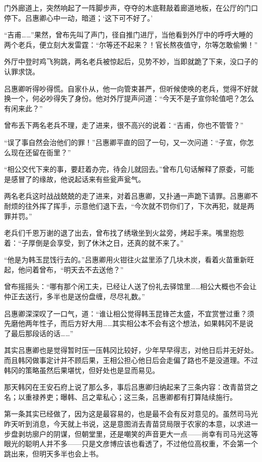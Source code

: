 门外廊道上，突然响起了一阵脚步声，夺夺的木底鞋敲着廊道地板，在公厅的门口停下。吕惠卿心中一动，暗道；‘这下可不好了。’

“吉甫……”果然，曾布先叫了声门，径自推门进厅，当他看到外厅中的呼呼大睡的两个老兵，便立刻大发雷霆：“尔等还不起来？！官长熬夜值守，尔等怎敢偷懒！”

外厅中登时鸡飞狗跳，两名老兵被惊起后，见势不妙，当即就跪了下来，没口子的认罪求饶。

吕惠卿听得吵得慌。自家仆从，他一向管束甚严，但听候使唤的老兵，觉得不好就换一个，何必吵得失了身份。他对外厅提声问道：“今天不是子宣你轮值吧？怎么有闲来此？”

曾布丢下两名老兵不理，走了进来，很不高兴的说着：“吉甫，你也不管管？”

“误了事自然会治他们的罪！”吕惠卿平直的回了一句，又一次问道：“子宣，你怎么现在还留在衙里？”

“相公交代下来的事，要赶着办完，待会儿就回去。”曾布几句话解释了原委，可能是感冒了的缘故，他说起话来有些瓮声瓮气。

两名老兵这时战战兢兢的走了进来，对着吕惠卿，又扑通一声跪下请罪。吕惠卿不耐烦的往外挥了挥手，示意他们退下去，“今次就不罚你们了，下次再犯，就是两罪并罚。”

老兵们千恩万谢的退了出去，曾布找了绣墩坐到火盆旁，烤起手来。嘴里抱怨着：“子厚倒是会享受，到了休沐之日，还真的就不来了。”

“他是为韩玉昆饯行去的。”吕惠卿用火钳往火盆里添了几块木炭，看着火苗重新旺起，他问着曾布，“明天去不去送他？”

曾布摇摇头：“哪有那个闲工夫，已经让人送了份礼去驿馆里……相公大概也不会让仲正去送行，多半也是送份盘缠，尽尽礼数。”

吕惠卿深深叹了一口气，道：“谁让相公觉得韩玉昆锋芒太盛，不宜赏誉过重？须先磨他两年性子，而后方好大用……其实相公本不会有这个想法，如果韩冈不是说了最后那段话的话……”

其实吕惠卿也是觉得暂时压一压韩冈比较好，少年早早得志，对他日后并无好处。而且韩冈做事定计并不顾后果，王相公担心他日后会走偏了路也不是没道理。不过韩冈的策略虽然后果堪忧，但好处也是显而易见。

那天韩冈在王安石府上说了那么多，事后吕惠卿归纳起来了三条内容：改青苗贷之名；以重禄养吏；曝韩、吕之辈私心；这三条，吕惠卿都有打算陆续施行。

第一条其实已经做了，因为这是最容易的，也是最不会有反对意见的。虽然司马光昨天听到消息，今天就上书说，这是意图消去青苗贷局限于农家的本意，以求进一步盘剥坊廓户的阴谋，但朝堂里，还是嘲笑的声音更大一点——尚幸有司马光这等眼光的聪明人并不多——只是文彦博应该也看透了，不过他位高权重，不会第一个跳出来，但明天多半也会上书。


